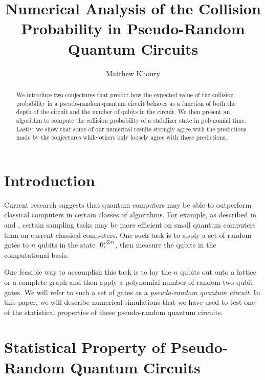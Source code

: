 \documentclass[11pt]{article}
\theoremstyle{definition}
\theoremstyle{plain}
\begin{document}
\title{\bf Numerical Analysis of the Collision Probability in Pseudo-Random Quantum Circuits}
\date{}
\author{Matthew Khoury} 
\maketitle


\begin{abstract}
We introduce two conjectures that predict how the expected value of the collision probability in a pseudo-random quantum circuit behaves as a function of both the depth of the circuit and the number of qubits in the circuit. We then present an algorithm to compute the collision probability of a stabilizer state in polynomial time. Lastly, we show that some of our numerical results strongly agree with the predictions made by the conjectures while others only loosely agree with those predictions. 
\end{abstract}

      

\section{Introduction}
Current research suggests that quantum computers may be able to outperform classical computers in certain classes of algorithms. For example, as described in {\cite{supremacy_1}} and {\cite{supremacy_2}}, certain sampling tasks may be more efficient on small quantum computers than on current classical computers. One such task is to apply a set of random gates to $n$ qubits in the state $\ket{0}^{\otimes n}$, then measure the qubits in the computational basis.

One feasible way to accomplish this task is to lay the $n$ qubits out onto a lattice or a complete graph and then apply a polynomial number of random two qubit gates. We will refer to such a set of gates as a \emph{pseudo-random quantum circuit}. In this paper, we will describe numerical simulations that we have used to test one of the statistical properties of these pseudo-random quantum circuits. 


\section{Statistical Property of Pseudo-Random Quantum Circuits}
\end{document}
